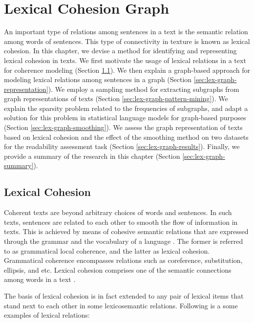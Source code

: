 
\chapter{Lexical Cohesion Graph}
\label{ch:lex-graph}

An important type of relations among sentences in a text is the semantic relation among words of sentences. 
This type of connectivity in texture is known as lexical cohesion. 
In this chapter, we devise a method for identifying and representing lexical cohesion in texts. 
We first motivate the usage of lexical relations in a text for coherence modeling (Section \ref{sec:lex-graph-motivation}). 
We then explain a graph-based approach for modeling lexical relations among sentences in a graph (Section \ref{sec:lex-graph-representation}). 
We employ a sampling method for extracting subgraphs from graph representations of texts (Section \ref{sec:lex-graph-pattern-mining}). 
We explain the sparsity problem related to the frequencies of subgraphs, and adapt a solution for this problem in statistical language models for graph-based purposes (Section \ref{sec:lex-graph-smoothing}). 
We assess the graph representation of texts based on lexical cohesion and the effect of the smoothing method on two datasets for the readability assessment task (Section \ref{sec:lex-graph-results}). 
Finally, we provide a summary of the research in this chapter (Section \ref{sec:lex-graph-summary}).

\section{Lexical Cohesion}
\label{sec:lex-graph-motivation}

Coherent texts are beyond arbitrary choices of words and sentences.  
In such texts, sentences are related to each other to smooth the flow of information in texts. 
This is achieved by means of cohesive semantic relations that are expressed through the grammar and the vocabulary of a language \cite{halliday76}. 
The former is referred to as grammatical local coherence, and the latter as lexical cohesion.  
Grammatical coherence encompasses relations such as coreference, substitution, ellipsis, and etc. 
Lexical cohesion comprises one of the semantic connections among words in a text \cite{hoey91}. 

The basis of lexical cohesion is in fact extended to any pair of lexical items that stand next to each other in some lexicosemantic relations. 
Following is a some examples of lexical relations: 

